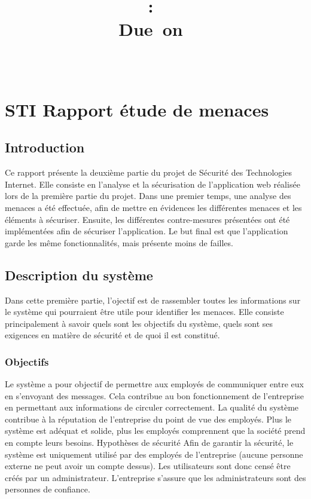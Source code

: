 \documentclass{article}
\title{
\vspace{2in}
\textmd{\textbf{\hmwkClass:\ \hmwkTitle}}\\
\normalsize\vspace{0.1in}\small{Due\ on\ \hmwkDueDate}\\
\vspace{0.1in}\large{\textit{\hmwkClassInstructor\ \hmwkClassTime}}
\vspace{3in}
}
\author{\textbf{\hmwkAuthorName}}
\date{} %
\begin{document}
\maketitle



\newpage
\tableofcontents
\newpage

\section{STI Rapport étude de menaces}

\subsection{Introduction}

Ce rapport présente la deuxième partie du projet de Sécurité des
Technologies Internet. Elle consiste en l'analyse et la sécurisation de
l'application web réalisée lors de la première partie du projet. Dans
une premier temps, une analyse des menaces a été effectuée, afin de
mettre en évidences les différentes menaces et les éléments à sécuriser.
Ensuite, les différentes contre-mesures présentées ont été implémentées
afin de sécuriser l'application. Le but final est que l'application
garde les même fonctionnalités, mais présente moins de failles.

\subsection{Description du système}

Dans cette première partie, l'ojectif est de rassembler toutes les
informations sur le système qui pourraient être utile pour identifier
les menaces. Elle consiste principalement à savoir quels sont les
objectifs du système, quels sont ses exigences en matière de sécurité et
de quoi il est constitué.

\subsubsection{Objectifs}

Le système a pour objectif de permettre aux employés de communiquer
entre eux en s'envoyant des messages. Cela contribue au bon
fonctionnement de l'entreprise en permettant aux informations de
circuler correctement. La qualité du système contribue à la réputation
de l'entreprise du point de vue des employés. Plus le système est
adéquat et solide, plus les employés comprennent que la société prend en
compte leurs besoins. Hypothèses de sécurité Afin de garantir la
sécurité, le système est uniquement utilisé par des employés de
l'entreprise (aucune personne externe ne peut avoir un compte dessus).
Les utilisateurs sont donc censé être créés par un administrateur.
L'entreprise s'assure que les administrateurs sont des personnes de
confiance.
\end{document}
